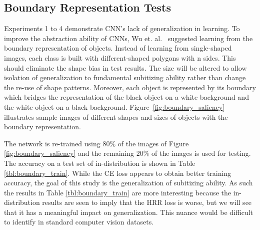 \documentclass[letterpaper]{article} %
\begin{document}
\subsection{Boundary Representation Tests}
Experiments 1 to 4 demonstrate CNN’s lack of generalization in learning. To improve the abstraction ability of CNNs, Wu et. al.~\cite{b1} suggested learning from the boundary representation of objects. Instead of learning from single-shaped images, each class is built with different-shaped polygons with n sides. This should eliminate the shape bias in test results. The size will be altered to allow isolation of generalization to fundamental subitizing ability rather than change the re-use of shape patterns. Moreover, each object is represented by its boundary which bridges the representation of the black object on a white background and the white object on a black background. Figure~\ref{fig:boundary_saliency} illustrates sample images of different shapes and sizes of objects with the boundary representation.
\par 
The network is re-trained using $80\%$ of the images of Figure \ref{fig:boundary_saliency} and the remaining $20\%$ of the images is used for testing. The accuracy on a test set of in-distribution is shown in Table \ref{tbl:boundary_train}. While the CE loss appears to obtain better training accuracy, the goal of this study is the generalization of subitizing ability. As such the results in Table \ref{tbl:boundary_train} are more interesting because the in-distribution results are seen to imply that the HRR loss is worse, but we will see that it has a meaningful impact on generalization. This nuance would be difficult to identify in standard computer vision datasets.
\end{document}
